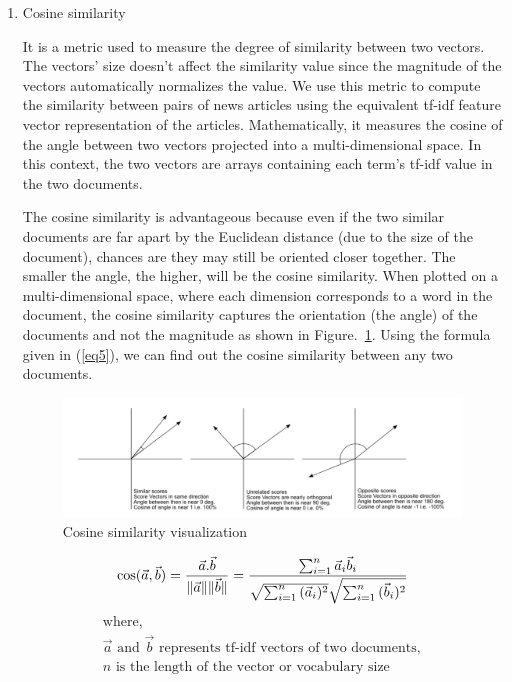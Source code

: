\documentclass[conference]{IEEEtran}
\begin{document}
\begin{enumerate}
\item Cosine similarity

It is a metric used to measure the degree of similarity between two
vectors. The vectors' size doesn't affect the similarity value since
the magnitude of the vectors automatically normalizes the value. We use
this metric to compute the similarity between pairs of news articles using the
equivalent tf-idf feature vector representation of the articles. Mathematically,
it measures the cosine of the angle between two vectors projected into a
multi-dimensional space. In this context, the two vectors are arrays containing
each term's tf-idf value in the two documents. 
\medskip

The cosine similarity is
advantageous because even if the two similar documents are far apart by the
Euclidean distance (due to the size of the document), chances are they may still
be oriented closer together. The smaller the angle, the higher, will be the
cosine similarity. When plotted on a multi-dimensional space, where each
dimension corresponds to a word in the document, the cosine similarity captures
the orientation (the angle) of the documents and not the magnitude \cite{r9} as
shown in Figure.~\ref{cosine}. Using the formula given in (\ref{eq5}), we can
find out the cosine similarity between any two documents.

\begin{figure}[htbp]
\centering
\includegraphics[width=0.5 \textwidth]{figures/cosine.png}
\caption{Cosine similarity visualization}
\label{cosine}
\end{figure}

\begin{equation}
\cos ({\vec a},{\vec b})= {{\vec a} . {\vec b} \over \|{\vec a}\| \|{\vec b}\|} = \frac{ \sum_{i=1}^{n}{{\vec a}_i{\vec b}_i} }{ \sqrt{\sum_{i=1}^{n}{({\vec a}_i)^2}} \sqrt{\sum_{i=1}^{n}{({\vec b}_i)^2}} } \label{eq5}
\end{equation}
 \begin{gather*}
  \text{where},\\
  \vec a \text{ and } \vec b \text{ represents tf-idf vectors of two documents},\\
  n \text{ is the length of the vector or vocabulary size}
\end{gather*}


\end{enumerate}
\end{document}
